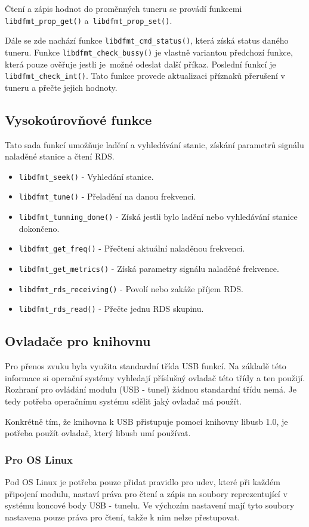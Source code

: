 Čtení a zápis hodnot do proměnných tuneru se provádí funkcemi \verb|libdfmt_prop_get()| a~\verb|libdfmt_prop_set()|.

Dále se zde nachází funkce \verb|libdfmt_cmd_status()|, která získá status daného tuneru. Funkce \verb|libdfmt_check_bussy()| je vlastně variantou předchozí funkce, která pouze ověřuje jestli je~možné odeslat další příkaz. Poslední funkcí je \verb|libdfmt_check_int()|. Tato funkce provede aktualizaci příznaků přerušení v tuneru a přečte jejich hodnoty.

\subsection{Vysokoúrovňové funkce}
Tato sada funkcí umožňuje ladění a vyhledávání stanic, získání parametrů signálu naladěné stanice a čtení RDS.

\begin{itemize}
\item \verb|libdfmt_seek()| - Vyhledání stanice.
\item \verb|libdfmt_tune()| - Přeladění na danou frekvenci. 
\item \verb|libdfmt_tunning_done()| - Získá jestli bylo ladění nebo vyhledávání stanice dokončeno.
\item \verb|libdfmt_get_freq()| - Přečtení aktuální naladěnou frekvenci.
\item \verb|libdfmt_get_metrics()| - Získá parametry signálu naladěné frekvence.
\item \verb|libdfmt_rds_receiving()| - Povolí nebo zakáže příjem RDS.
\item \verb|libdfmt_rds_read()| - Přečte jednu RDS skupinu.
\end{itemize}

\subsection{Ovladače pro knihovnu}
Pro přenos zvuku byla využita standardní třída USB funkcí. Na základě této informace si operační systémy vyhledají příslušný ovladač této třídy a ten použijí. Rozhraní pro ovládání modulu (USB - \iic tunel) žádnou standardní třídu nemá. Je tedy potřeba operačnímu systému sdělit jaký ovladač má použít.

Konkrétně tím, že knihovna k USB přistupuje pomocí knihovny libusb 1.0, je potřeba použít ovladač, který libusb umí používat.

\subsubsection{Pro OS Linux}
Pod OS Linux je potřeba pouze přidat pravidlo pro udev, které při každém připojení modulu, nastaví práva pro čtení a zápis na soubory reprezentující v systému koncové body USB - \iic tunelu. Ve výchozím nastavení mají tyto soubory nastavena pouze práva pro čtení, takže k nim nelze přestupovat.

